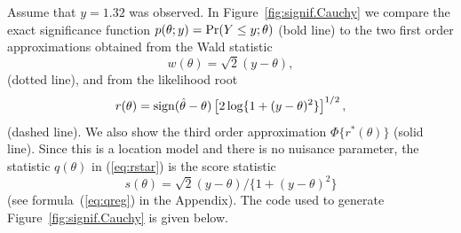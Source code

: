 \documentclass[a4paper,11pt]{article}
\begin{document}
Assume that $y=1.32$ was observed.  In Figure~\ref{fig:signif.Cauchy} we compare the exact significance function $p(\theta;y) = {\rm Pr}(Y\leq y;\theta)$ (bold line) to the two first order approximations obtained from the Wald statistic 
%
\[
w(\theta) = \sqrt{2}(y-\theta),
\]
%
(dotted line), and from the likelihood root 
%
\[
r(\theta) = {\rm sign}(\hat\theta - \theta)\left[2\log\{1+(y-\theta)^2\}\right]^{1/2},
\]
%
(dashed line).  We also show the third order approximation $\Phi\{r^*(\theta)\}$ (solid line).  Since this is a location model and there is no nuisance parameter, the statistic $q(\theta)$ in (\ref{eq:rstar}) is the score statistic 
%
\[
s(\theta) = \sqrt{2}(y-\theta)/\{1+(y-\theta)^2\}
\]
%
(see formula~(\ref{eq:qreg}) in the Appendix).  The code used to generate Figure~\ref{fig:signif.Cauchy} is given below.
\end{document}
